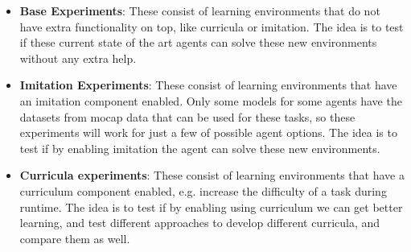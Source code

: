 \begin{itemize}
    \item \textbf{Base Experiments}: These consist of learning environments that do not have
                                     extra functionality on top, like curricula or imitation.
                                     The idea is to test if these current state of the art 
                                     agents can solve these new environments without any extra help.

    \item \textbf{Imitation Experiments}: These consist of learning environments that have an imitation 
                                          component enabled. Only some models for some agents have the datasets
                                          from mocap data that can be used for these tasks, so these experiments will
                                          work for just a few of possible agent options. The idea is to
                                          test if by enabling imitation the agent can solve these new environments.

    \item \textbf{Curricula experiments}: These consist of learning environments that have a curriculum component
                                          enabled, e.g. increase the difficulty of a task during runtime.
                                          The idea is to test if by enabling using curriculum we can get better learning,
                                          and test different approaches to develop different curricula, and compare them as well.
\end{itemize}


